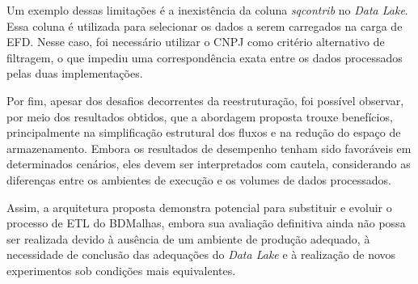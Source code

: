 Um exemplo dessas limitações é a inexistência da coluna \textit{sqcontrib} no \textit{Data Lake}. 
Essa coluna é utilizada para selecionar os dados a serem carregados na carga de EFD. Nesse caso, 
foi necessário utilizar o CNPJ como critério alternativo de filtragem, o que impediu uma 
correspondência exata entre os dados processados pelas duas implementações.

Por fim, apesar dos desafios decorrentes da reestruturação, foi possível observar, por meio dos 
resultados obtidos, que a abordagem proposta trouxe benefícios, principalmente na simplificação 
estrutural dos fluxos e na redução do espaço de armazenamento. Embora os resultados de desempenho
tenham sido favoráveis em determinados cenários, eles devem ser interpretados com cautela, 
considerando as diferenças entre os ambientes de execução e os volumes de dados processados.

Assim, a arquitetura proposta demonstra potencial para substituir e evoluir o processo de ETL 
do BDMalhas, embora sua avaliação definitiva ainda não possa ser realizada devido à ausência 
de um ambiente de produção adequado, à necessidade de conclusão das adequações do 
\textit{Data Lake} e à realização de novos experimentos sob condições mais equivalentes.